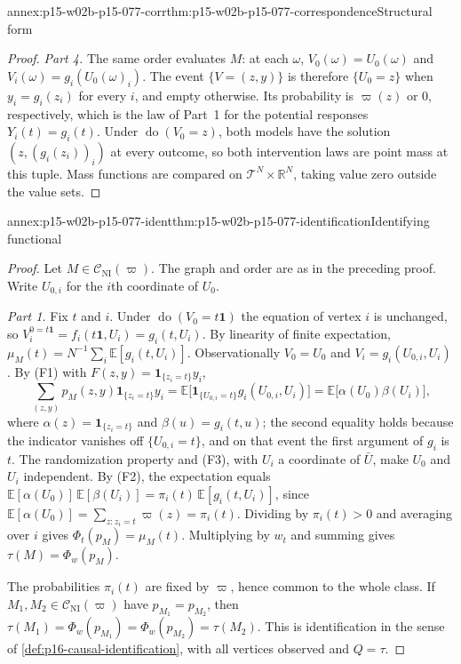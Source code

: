 \begin{annexitem}{annex:p15-w02b-p15-077-corr}{thm:p15-w02b-p15-077-correspondence}{Structural form}
\begin{proof}
\emph{Part 4.} The same order evaluates \(M\): at each \(\omega\),
\(V_0(\omega)=U_0(\omega)\) and \(V_i(\omega)=g_i(U_0(\omega)_i)\).
The event \(\{V=(z,y)\}\) is therefore \(\{U_0=z\}\) when
\(y_i=g_i(z_i)\) for every \(i\), and empty otherwise. Its probability is
\(\varpi(z)\) or \(0\), respectively, which is the law of Part~1 for the
potential responses \(Y_i(t)=g_i(t)\). Under
\(\operatorname{do}(V_0=z)\), both models have the solution
\((z,(g_i(z_i))_i)\) at every outcome, so both intervention laws are point
mass at this tuple. Mass functions are compared on
\(\mathcal T^N\times\mathbb R^N\), taking value zero outside the value sets.
\end{proof}
\end{annexitem}

\begin{annexitem}{annex:p15-w02b-p15-077-ident}{thm:p15-w02b-p15-077-identification}{Identifying functional}
\begin{proof}
Let \(M\in\mathcal C_{\mathrm{NI}}(\varpi)\). The graph and order are as
in the preceding proof. Write \(U_{0,i}\) for the \(i\)th coordinate of
\(U_0\).

\emph{Part 1.} Fix \(t\) and \(i\). Under
\(\operatorname{do}(V_0=t\mathbf 1)\) the equation of vertex \(i\) is
unchanged, so \(V_i^{0=t\mathbf 1}=f_i(t\mathbf 1,U_i)=g_i(t,U_i)\).
By linearity of finite expectation,
\(\mu_M(t)=N^{-1}\sum_i\mathbb E[g_i(t,U_i)]\).
Observationally \(V_0=U_0\) and \(V_i=g_i(U_{0,i},U_i)\). By (F1)
with \(F(z,y)=\mathbf 1_{\{z_i=t\}}y_i\),
\[
 \sum_{(z,y)}p_M(z,y)\mathbf 1_{\{z_i=t\}}y_i
 =\mathbb E\bigl[\mathbf 1_{\{U_{0,i}=t\}}g_i(U_{0,i},U_i)\bigr]
 =\mathbb E\bigl[\alpha(U_0)\beta(U_i)\bigr],
\]
where \(\alpha(z)=\mathbf 1_{\{z_i=t\}}\) and
\(\beta(u)=g_i(t,u)\); the second equality holds because the indicator
vanishes off \(\{U_{0,i}=t\}\), and on that event the first argument of
\(g_i\) is \(t\). The randomization property and (F3), with \(U_i\) a
coordinate of \(\bar U\), make \(U_0\) and \(U_i\) independent. By (F2),
the expectation equals
\(\mathbb E[\alpha(U_0)]\,\mathbb E[\beta(U_i)]
 =\pi_i(t)\,\mathbb E[g_i(t,U_i)]\), since
\(\mathbb E[\alpha(U_0)]=\sum_{z:z_i=t}\varpi(z)=\pi_i(t)\).
Dividing by \(\pi_i(t)>0\) and averaging over \(i\) gives
\(\Phi_t(p_M)=\mu_M(t)\). Multiplying by \(w_t\) and summing gives
\(\tau(M)=\Phi_w(p_M)\).

The probabilities \(\pi_i(t)\) are fixed by \(\varpi\), hence common to
the whole class. If \(M_1,M_2\in\mathcal C_{\mathrm{NI}}(\varpi)\) have
\(p_{M_1}=p_{M_2}\), then
\(\tau(M_1)=\Phi_w(p_{M_1})=\Phi_w(p_{M_2})=\tau(M_2)\). This is
identification in the sense of \cref{def:p16-causal-identification}, with
all vertices observed and \(Q=\tau\).


\end{proof}
\end{annexitem}
